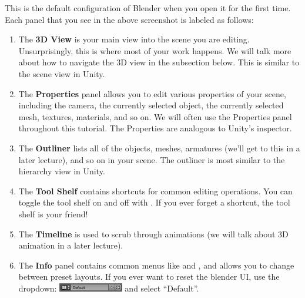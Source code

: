 \documentclass[11pt]{article}
\begin{document}
\noindent This is the default configuration of Blender when you open it for the first time.  Each
panel that you see in the above screenshot is labeled as follows:
\begin{enumerate}
    \item The \textbf{3D View} is your main view into the scene you are editing.  Unsurprisingly,
    this is where most of your work happens.  We will talk more about how to navigate the 3D view
    in the subsection below.  This is similar to the scene view in Unity.
    \item The \textbf{Properties} panel allows you to edit various properties of your scene, 
    including the camera, the currently selected object, the currently selected mesh, textures,
    materials, and so on.  We will often use the Properties panel throughout this tutorial.
    The Properties are analogous to Unity's inspector.
    \item The \textbf{Outliner} lists all of the objects, meshes, armatures (we'll get to this in a
    later lecture), and so on in your scene.  The outliner is most similar to the hierarchy view in
    Unity.
    \item The \textbf{Tool Shelf} contains shortcuts for common editing operations.  You can toggle
    the tool shelf on and off with .  If you ever forget a shortcut, the tool shelf is your
    friend!
    \item The \textbf{Timeline} is used to scrub through animations (we will talk about 3D animation
    in a later lecture).
    \item The \textbf{Info} panel contains common menus like  and , and
    allows you to change between preset layouts.  If you ever want to reset the blender UI, use the
    dropdown: \includegraphics[height=1.0em]{layout-default} and select ``Default''.
\end{enumerate}
\end{document}
